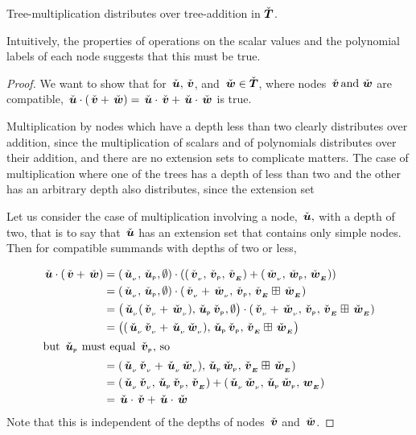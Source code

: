 \begin{proposition}\label{TMdistrib}
  Tree-multiplication distributes over tree-addition in $\DOMR$.

  Intuitively, the properties of operations on the scalar values and
  the \polyrat polynomial labels of each node suggests that this must be
  true. 

  \begin{proof}
    We want to show that for $\rnode{u}, \rnode{v}$, and $\rnode{w} \in
    \DOMR$, where nodes $\rnode{v} \mand \rnode{w}$ are compatible, 
    $\rnode{u}\tdot(\rnode{v}+\rnode{w}) = \rnode{u}\tdot\rnode{v}+\rnode{u}\tdot\rnode{w}$
    is true.
  
    Multiplication by nodes which have a depth less than two clearly
    distributes over addition, since the multiplication of scalars and
    of polynomials distributes over their addition, and there are no
    extension sets to complicate matters. The case of multiplication
    where one of the trees  has a depth of less than two and the other
    has an arbitrary depth also distributes, since the extension set 

    Let us consider the case of multiplication involving a node, $\rnode{u},$ with a depth
    of two, that is to say that $\rnode{u}$ has an extension set that
    contains only simple nodes.  Then for compatible summands with
    depths of two or less,

    \begin{align*}
      \rnode{u}\tdot(\rnode{v}+\rnode{w}) &=
      (\rv{u},\rlabel{u},\emptyset)\tdot((\rv{v},\rlabel{v},\rextn{v})+(\rv{w},\rlabel{w},\rextn{w}))\\
      &=(\rv{u},\rlabel{u},\emptyset)\tdot(\rv{v}+\rv{w},\rlabel{v},\rextn{v}\stplus\rextn{w})\\
      &=\bigl(\rv{u}(\rv{v} + \rv{w}),\rlabel{u}\rlabel{v},\emptyset\bigr)\tdot(\rv{v}+\rv{w},\rlabel{v},\rextn{v}\stplus\rextn{w})\\
      &=\bigl((\rv{u}\rv{v} + \rv{u}\rv{w}),\rlabel{u}\rlabel{v},\rextn{v}\stplus\rextn{w}\bigr)\\
      \intertext{but $\rlabel{u}$ must equal $\rlabel{v}$, so}
      &=(\rv{u}\rv{v} + \rv{u}\rv{w}),\rlabel{u}\rlabel{w},\rextn{v}\stplus\rextn{w})\\
      &=(\rv{u}\rv{v},\rlabel{u}\rlabel{v},\rextn{v})+(\rv{u}\rv{w},\rlabel{u}\rlabel{w},\extn{w})\\
      &=\rnode{u}\tdot\rnode{v} + \rnode{u}\tdot\rnode{w}
    \end{align*}
    Note that this is independent of the depths of nodes $\rnode{v}$ and $\rnode{w}$.


\end{proof}
\end{proposition}
